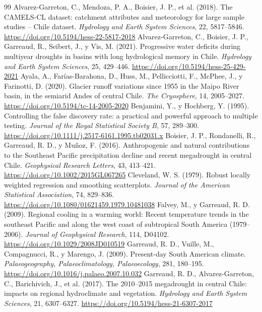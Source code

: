 \documentclass[11pt,letterpaper]{article}
\begin{document}
\begin{thebibliography}{99}\small
 Alvarez-Garreton, C., Mendoza, P. A., Boisier, J. P., et al. (2018). The CAMELS-CL dataset: catchment attributes and meteorology for large sample studies -- Chile dataset. \emph{Hydrology and Earth System Sciences}, 22, 5817--5846. \url{https://doi.org/10.5194/hess-22-5817-2018}
 Alvarez-Garreton, C., Boisier, J. P., Garreaud, R., Seibert, J., y Vis, M. (2021). Progressive water deficits during multiyear droughts in basins with long hydrological memory in Chile. \emph{Hydrology and Earth System Sciences}, 25, 429--446. \url{https://doi.org/10.5194/hess-25-429-2021}
 Ayala, A., Farías-Barahona, D., Huss, M., Pellicciotti, F., McPhee, J., y Farinotti, D. (2020). Glacier runoff variations since 1955 in the Maipo River basin, in the semiarid Andes of central Chile. \emph{The Cryosphere}, 14, 2005--2027. \url{https://doi.org/10.5194/tc-14-2005-2020}
 Benjamini, Y., y Hochberg, Y. (1995). Controlling the false discovery rate: a practical and powerful approach to multiple testing. \emph{Journal of the Royal Statistical Society B}, 57, 289--300. \url{https://doi.org/10.1111/j.2517-6161.1995.tb02031.x}
 Boisier, J. P., Rondanelli, R., Garreaud, R. D., y Muñoz, F. (2016). Anthropogenic and natural contributions to the Southeast Pacific precipitation decline and recent megadrought in central Chile. \emph{Geophysical Research Letters}, 43, 413--421. \url{https://doi.org/10.1002/2015GL067265}
 Cleveland, W. S. (1979). Robust locally weighted regression and smoothing scatterplots. \emph{Journal of the American Statistical Association}, 74, 829--836. \url{https://doi.org/10.1080/01621459.1979.10481038}
 Falvey, M., y Garreaud, R. D. (2009). Regional cooling in a warming world: Recent temperature trends in the southeast Pacific and along the west coast of subtropical South America (1979--2006). \emph{Journal of Geophysical Research}, 114, D04102. \url{https://doi.org/10.1029/2008JD010519}
 Garreaud, R. D., Vuille, M., Compagnucci, R., y Marengo, J. (2009). Present-day South American climate. \emph{Palaeogeography, Palaeoclimatology, Palaeoecology}, 281, 180--195. \url{https://doi.org/10.1016/j.palaeo.2007.10.032}
 Garreaud, R. D., Alvarez-Garreton, C., Barichivich, J., et al. (2017). The 2010--2015 megadrought in central Chile: impacts on regional hydroclimate and vegetation. \emph{Hydrology and Earth System Sciences}, 21, 6307--6327. \url{https://doi.org/10.5194/hess-21-6307-2017}

\end{thebibliography}
\end{document}
